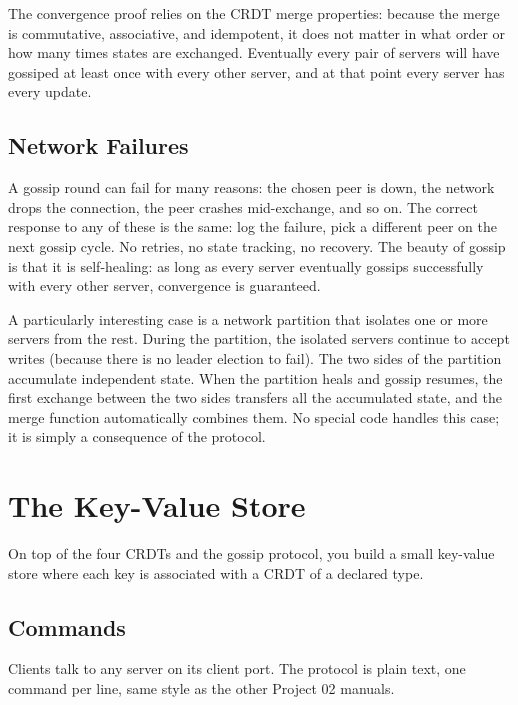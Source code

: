 \documentclass[11pt,a4paper]{article}
\begin{document}
The convergence proof relies on the CRDT merge properties: because the merge is commutative, associative, and idempotent, it does not matter in what order or how many times states are exchanged. Eventually every pair of servers will have gossiped at least once with every other server, and at that point every server has every update.

\subsection{Network Failures}
A gossip round can fail for many reasons: the chosen peer is down, the network drops the connection, the peer crashes mid-exchange, and so on. The correct response to any of these is the same: log the failure, pick a different peer on the next gossip cycle. No retries, no state tracking, no recovery. The beauty of gossip is that it is self-healing: as long as every server eventually gossips successfully with every other server, convergence is guaranteed.

A particularly interesting case is a network partition that isolates one or more servers from the rest. During the partition, the isolated servers continue to accept writes (because there is no leader election to fail). The two sides of the partition accumulate independent state. When the partition heals and gossip resumes, the first exchange between the two sides transfers all the accumulated state, and the merge function automatically combines them. No special code handles this case; it is simply a consequence of the protocol.

\section{The Key-Value Store}

On top of the four CRDTs and the gossip protocol, you build a small key-value store where each key is associated with a CRDT of a declared type.

\subsection{Commands}
Clients talk to any server on its client port. The protocol is plain text, one command per line, same style as the other Project 02 manuals.
\end{document}
